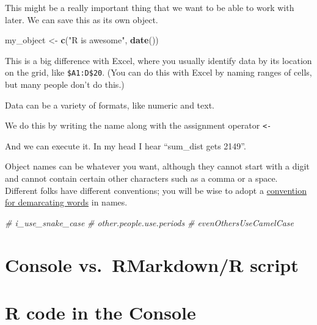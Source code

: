 \documentclass[]{book}
\newenvironment{Shaded}{\begin{snugshade}}{\end{snugshade}}
\newcommand{\CommentTok}[1]{\textcolor[rgb]{0.56,0.35,0.01}{\textit{#1}}}
\newcommand{\KeywordTok}[1]{\textcolor[rgb]{0.13,0.29,0.53}{\textbf{#1}}}
\newcommand{\NormalTok}[1]{#1}
\newcommand{\OperatorTok}[1]{\textcolor[rgb]{0.81,0.36,0.00}{\textbf{#1}}}
\newcommand{\StringTok}[1]{\textcolor[rgb]{0.31,0.60,0.02}{#1}}
\begin{document}
This might be a really important thing that we want to be able to work with later. We can save this as its own object.

\begin{Shaded}
\begin{Highlighting}[]
\NormalTok{my_object <-}\StringTok{ }\KeywordTok{c}\NormalTok{(}\StringTok{"R is awesome"}\NormalTok{, }\KeywordTok{date}\NormalTok{())}
\end{Highlighting}
\end{Shaded}

This is a big difference with Excel, where you usually identify data by its location on the grid, like \texttt{\$A1:D\$20}. (You can do this with Excel by naming ranges of cells, but many people don't do this.)

Data can be a variety of formats, like numeric and text.

We do this by writing the name along with the assignment operator \texttt{\textless{}-}

\begin{Shaded}
\end{Shaded}

And we can execute it. In my head I hear ``sum\_dist gets 2149''.

Object names can be whatever you want, although they cannot start with a digit and cannot contain certain other characters such as a comma or a space. Different folks have different conventions; you will be wise to adopt a \href{http://en.wikipedia.org/wiki/Snake_case}{convention for demarcating words} in names.

\begin{Shaded}
\begin{Highlighting}[]
\CommentTok{# i_use_snake_case}
\CommentTok{# other.people.use.periods}
\CommentTok{# evenOthersUseCamelCase}
\end{Highlighting}
\end{Shaded}

\hypertarget{console-vs.rmarkdownr-script}{%
\section{Console vs.~RMarkdown/R script}\label{console-vs.rmarkdownr-script}}

\hypertarget{r-code-in-the-console}{%
\section{R code in the Console}\label{r-code-in-the-console}}
\end{document}
